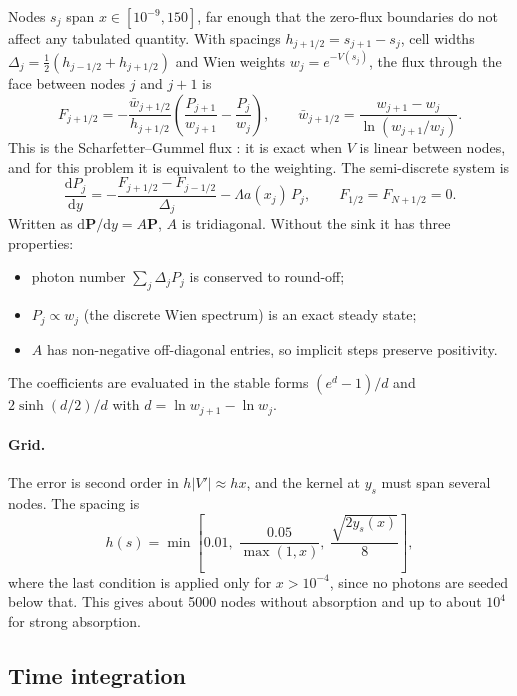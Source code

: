 \documentclass[11pt]{article}
\newcommand{\dd}{\mathrm{d}}
\begin{document}
Nodes $s_j$ span $x\in[10^{-9},150]$, far enough that the zero-flux
boundaries do not affect any tabulated quantity. With spacings
$h_{j+1/2}=s_{j+1}-s_j$, cell widths
$\Delta_j=\frac12(h_{j-1/2}+h_{j+1/2})$ and Wien weights
$w_j=e^{-V(s_j)}$, the flux through the face between nodes $j$ and $j+1$ is
\begin{equation}\label{eq:flux}
  F_{j+1/2} = -\frac{\bar w_{j+1/2}}{h_{j+1/2}}
  \left(\frac{P_{j+1}}{w_{j+1}}-\frac{P_j}{w_j}\right),
  \qquad
  \bar w_{j+1/2} = \frac{w_{j+1}-w_j}{\ln(w_{j+1}/w_j)} .
\end{equation}
This is the Scharfetter--Gummel flux \citep{scharfetter1969}: it is exact
when $V$ is linear between nodes, and for this problem it is equivalent to
the \citet{chang1970} weighting. The semi-discrete system is
\begin{equation}
  \frac{\dd P_j}{\dd y} = -\frac{F_{j+1/2}-F_{j-1/2}}{\Delta_j}
  - \Lambda a(x_j)\,P_j,
  \qquad F_{1/2}=F_{N+1/2}=0 .
\end{equation}
Written as $\dd\mathbf P/\dd y = A\mathbf P$, $A$ is tridiagonal. Without the
sink it has three properties:
\begin{itemize}
\item photon number $\sum_j\Delta_jP_j$ is conserved to round-off;
\item $P_j\propto w_j$ (the discrete Wien spectrum) is an exact steady state;
\item $A$ has non-negative off-diagonal entries, so implicit steps preserve
  positivity.
\end{itemize}
The coefficients are evaluated in the stable forms $(e^d-1)/d$ and
$2\sinh(d/2)/d$ with $d=\ln w_{j+1}-\ln w_j$.

\paragraph{Grid.} The error is second order in $h|V'|\approx hx$, and the
kernel at $y_s$ must span several nodes. The spacing is
\begin{equation}
  h(s) = \min\!\left[0.01,\; \frac{0.05}{\max(1,x)},\;
  \frac{\sqrt{2y_s(x)}}{8}\right],
\end{equation}
where the last condition is applied only for $x>10^{-4}$, since no photons
are seeded below that. This gives about 5000 nodes without absorption and
up to about $10^4$ for strong absorption.

\subsection{Time integration}
\end{document}
